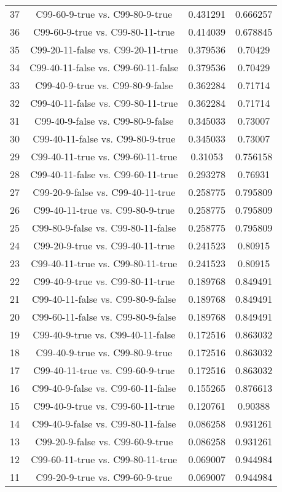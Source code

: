 \documentclass[a4paper,10pt]{article}
\begin{document}
\begin{landscape}
\begin{table}[!htp]
\begin{tabular}{cccc}
37&C99-60-9-true vs. C99-80-9-true&0.431291&0.666257\\
36&C99-60-9-true vs. C99-80-11-true&0.414039&0.678845\\
35&C99-20-11-false vs. C99-20-11-true&0.379536&0.70429\\
34&C99-40-11-false vs. C99-60-11-false&0.379536&0.70429\\
33&C99-40-9-true vs. C99-80-9-false&0.362284&0.71714\\
32&C99-40-11-false vs. C99-80-11-true&0.362284&0.71714\\
31&C99-40-9-false vs. C99-80-9-false&0.345033&0.73007\\
30&C99-40-11-false vs. C99-80-9-true&0.345033&0.73007\\
29&C99-40-11-true vs. C99-60-11-true&0.31053&0.756158\\
28&C99-40-11-false vs. C99-60-11-true&0.293278&0.76931\\
27&C99-20-9-false vs. C99-40-11-true&0.258775&0.795809\\
26&C99-40-11-true vs. C99-80-9-true&0.258775&0.795809\\
25&C99-80-9-false vs. C99-80-11-false&0.258775&0.795809\\
24&C99-20-9-true vs. C99-40-11-true&0.241523&0.80915\\
23&C99-40-11-true vs. C99-80-11-true&0.241523&0.80915\\
22&C99-40-9-true vs. C99-80-11-true&0.189768&0.849491\\
21&C99-40-11-false vs. C99-80-9-false&0.189768&0.849491\\
20&C99-60-11-false vs. C99-80-9-false&0.189768&0.849491\\
19&C99-40-9-true vs. C99-40-11-false&0.172516&0.863032\\
18&C99-40-9-true vs. C99-80-9-true&0.172516&0.863032\\
17&C99-40-11-true vs. C99-60-9-true&0.172516&0.863032\\
16&C99-40-9-false vs. C99-60-11-false&0.155265&0.876613\\
15&C99-40-9-true vs. C99-60-11-true&0.120761&0.90388\\
14&C99-40-9-false vs. C99-80-11-false&0.086258&0.931261\\
13&C99-20-9-false vs. C99-60-9-true&0.086258&0.931261\\
12&C99-60-11-true vs. C99-80-11-true&0.069007&0.944984\\
11&C99-20-9-true vs. C99-60-9-true&0.069007&0.944984\\

\end{tabular}
\end{table}
\end{landscape}
\end{document}
